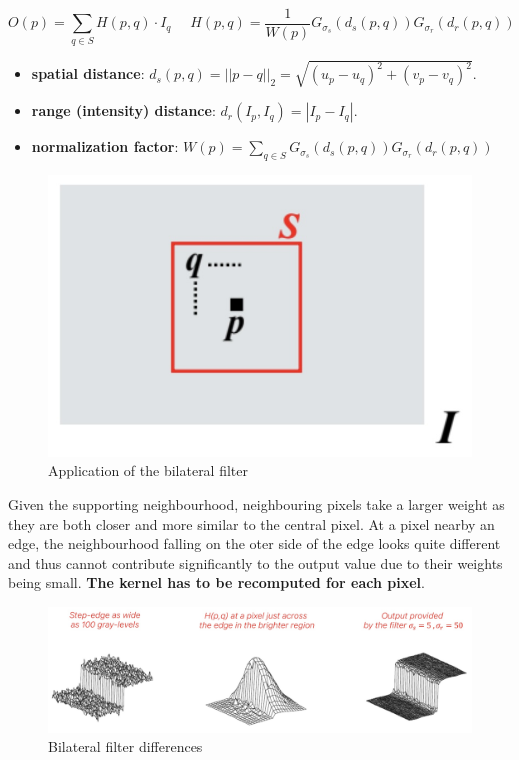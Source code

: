 \documentclass{article}
\begin{document}
$$O(p) = \sum_{q\in S} H(p,q) \cdot I_q \,\,\,\,\,\,\,\, H(p,q) = \frac{1}{W(p)} G_{\sigma_s}(d_s(p,q))G_{\sigma_r}(d_r(p,q))$$

\begin{itemize}
  \item \textbf{spatial distance}: $d_s(p,q) = ||p-q||_2 = \sqrt{(u_p - u_q)^2 + (v_p - v_q)^2}$.
  \item \textbf{range (intensity) distance}: $d_r(I_p, I_q) = |I_p - I_q|$.
  \item \textbf{normalization factor}: $W(p) = \sum_{q \in S} G_{\sigma_s}(d_s(p,q))G_{\sigma_r}(d_r(p,q))$
\end{itemize}

\begin{figure}[htbp]
  \centering
  \includegraphics[width=0.5\linewidth]{./img/bilateral_filter_application.jpg}
  \caption{Application of the bilateral filter}
  \label{fig:bilateral_filter_application}
\end{figure}

Given the supporting neighbourhood, neighbouring pixels take a larger weight as they are both closer and more similar to the central pixel.
At a pixel nearby an edge, the neighbourhood falling on the oter side of the edge looks quite different and thus cannot contribute significantly to the output value due to their weights being small.
\textbf{The kernel has to be recomputed for each pixel}.

\begin{figure}[htbp]
  \centering
  \includegraphics[width=0.9\linewidth]{./img/bilateral_filter.jpg}
  \caption{Bilateral filter differences}
  \label{fig:bilateral_filter}
\end{figure}
\end{document}
